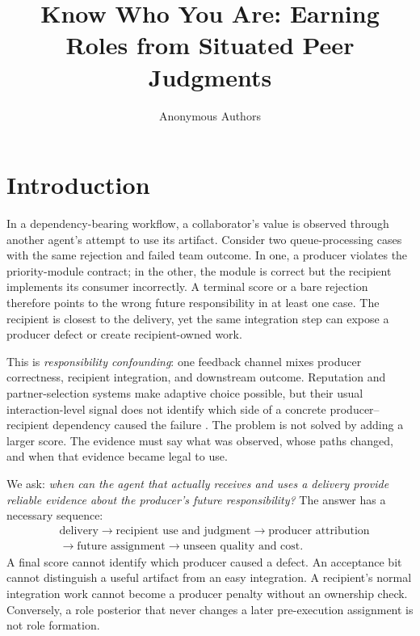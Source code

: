 \documentclass[sigconf,anonymous]{aamas}
\title[Know Who You Are]{Know Who You Are: Earning Roles from Situated Peer Judgments}
\author{Anonymous Authors}
\affiliation{\institution{Internal research draft}}
\begin{document}
\maketitle

\section{Introduction}

In a dependency-bearing workflow, a collaborator's value is observed through another agent's attempt to use its artifact. Consider two queue-processing cases with the same rejection and failed team outcome. In one, a producer violates the priority-module contract; in the other, the module is correct but the recipient implements its consumer incorrectly. A terminal score or a bare rejection therefore points to the wrong future responsibility in at least one case. The recipient is closest to the delivery, yet the same integration step can expose a producer defect or create recipient-owned work.

This is \emph{responsibility confounding}: one feedback channel mixes producer correctness, recipient integration, and downstream outcome. Reputation and partner-selection systems make adaptive choice possible, but their usual interaction-level signal does not identify which side of a concrete producer--recipient dependency caused the failure \cite{sabater2002reputation,pinyol2013trust,leung2025partner,russell2026partner}. The problem is not solved by adding a larger score. The evidence must say what was observed, whose paths changed, and when that evidence became legal to use.

We ask: \emph{when can the agent that actually receives and uses a delivery provide reliable evidence about the producer's future responsibility?} The answer has a necessary sequence:
\begin{equation}
\begin{aligned}
&\text{delivery}\rightarrow\text{recipient use and judgment}\rightarrow\text{producer attribution}\\
&\rightarrow\text{future assignment}\rightarrow\text{unseen quality and cost}.
\end{aligned}
\label{eq:story}
\end{equation}
A final score cannot identify which producer caused a defect. An acceptance bit cannot distinguish a useful artifact from an easy integration. A recipient's normal integration work cannot become a producer penalty without an ownership check. Conversely, a role posterior that never changes a later pre-execution assignment is not role formation.
\end{document}
